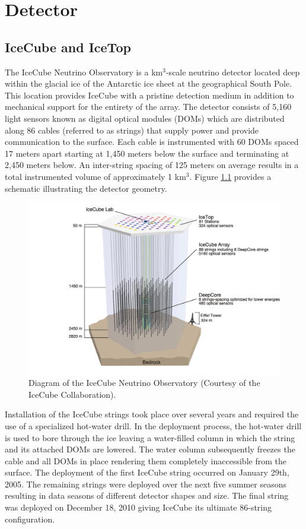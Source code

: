 \documentclass{gatech-thesis}
\begin{document}
\chapter{Detector}
\section{IceCube and IceTop}
The IceCube Neutrino Observatory is a km$^{3}$-scale neutrino detector located deep within the glacial ice of the Antarctic ice sheet at the geographical South Pole. This location provides IceCube with a pristine detection medium in addition to mechanical support for the entirety of the array. The detector consists of 5,160 light sensors known as digital optical modules (DOMs) which are distributed along 86 cables (referred to as strings) that supply power and provide communication to the surface. Each cable is instrumented with 60 DOMs spaced 17 meters apart starting at 1,450 meters below the surface and terminating at 2,450 meters below. An inter-string spacing of 125 meters on average results in a total instrumented volume of approximately 1 km$^{3}$. Figure \ref{fig:icecube} provides a schematic illustrating the detector geometry.

\begin{figure}[ht]
  \begin{center}
    \includegraphics[width=1.0\textwidth,keepaspectratio]{ArrayWSeasonsLabels.pdf}
  \end{center}
  \caption[IceCube Diagram]{Diagram of the IceCube Neutrino Observatory (Courtesy of the IceCube Collaboration).}
  \label{fig:icecube}
\end{figure}

Installation of the IceCube strings took place over several years and required the use of a specialized hot-water drill. In the deployment process, the hot-water drill is used to bore through the ice leaving a water-filled column in which the string and its attached DOMs are lowered. The water column subsequently freezes the cable and all DOMs in place rendering them completely inaccessible from the surface. The deployment of the first IceCube string occurred on January 29th, 2005. The remaining strings were deployed over the next five summer seasons resulting in data seasons of different detector shapes and size. The final string was deployed on December 18, 2010 giving IceCube its ultimate 86-string configuration.
\end{document}
